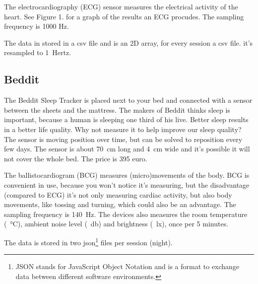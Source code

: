 			The electrocardiography (ECG) sensor measures the electrical activity of the heart.\cite{ECG} See Figure 1. for a graph of the results an ECG procudes. The sampling frequency is 1000 Hz.



			The data in stored in a csv file and is an 2D array, for every session a csv file. it's resampled to \SI{1}{Hertz}.
	\subsection{Beddit}
		The Beddit Sleep Tracker is placed next to your bed and connected with a sensor between the sheets and the mattress. The makers of Beddit thinks sleep is important, because a human is sleeping one third of his live. Better sleep results in a better life quality. Why not measure it to help improve our sleep quality? The sensor is moving position over time, but can be solved to reposition every few days. The sensor is about \SI{70}{\centi\metre} long and \SI{4}{\centi\metre} wide and it's possible it will not cover the whole bed. 
			The price is 395 euro.

			The ballistocardiogram (BCG) measures (micro)movements of the body.\cite{beddit}
			BCG is convenient in use, because you won't notice it's measuring, but the disadvantage (compared to ECG) it's not only measuring cardiac activity, but also body movements, like tossing and turning, which could also be an advantage.\cite{bcg} The sampling frequency is \SI{140}{\hertz}. The devices also measures the room temperature (\SI{}{\celsius}), ambient noise level (\SI{}{\decibel}) and brightness (\SI{}{\lux}), once per 5 minutes.\cite{bedditapi}

			The data is stored in two json\footnote{JSON stands for JavaScript Object Notation and is a format to exchange data between different software environments.\cite{json}} files per session (night).








